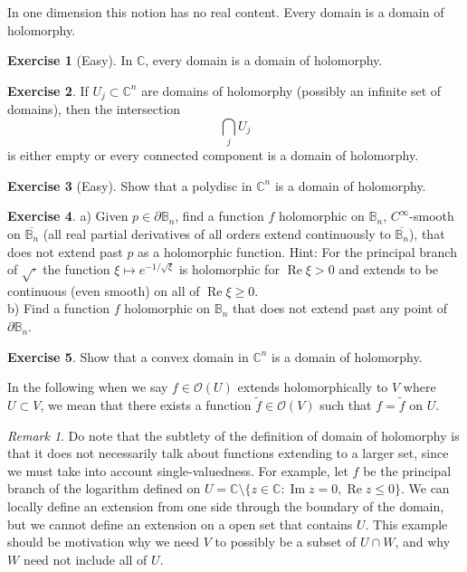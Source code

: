 \documentclass[12pt,openany]{book}
\renewcommand{\Re}{\operatorname{Re}}
\renewcommand{\Im}{\operatorname{Im}}
\newcommand{\C}{{\mathbb{C}}}
\newcommand{\bB}{{\mathbb{B}}}
\newcommand{\sO}{{\mathscr{O}}}
\theoremstyle{plain}
\theoremstyle{remark}
\newtheorem{remark}[thm]{Remark}
\theoremstyle{definition}
\newenvironment{exbox}{%
    \def\FrameCommand{\vrule width 1pt \relax\hspace {10pt}}%
    \MakeFramed {\advance \hsize -\width \FrameRestore }%
}{%
    \endMakeFramed
}
\theoremstyle{exercise}
\newtheorem{exercise}{Exercise}[section]
\theoremstyle{example}
\begin{document}
\pagebreak[2]
In one dimension this notion has no real content.  Every domain is a domain
of holomorphy.

\begin{exbox}
\begin{exercise}[Easy]
In $\C$, every domain is a domain of holomorphy.
\end{exercise}

\begin{exercise}
If $U_j \subset \C^n$ are domains of holomorphy (possibly an infinite set of
domains), then the intersection
\begin{equation*}
\bigcap_{j} U_j
\end{equation*}
is either empty or every connected component is a domain of holomorphy.
\end{exercise}

\begin{exercise}[Easy]
Show that a polydisc in $\C^n$ is a domain of holomorphy.
\end{exercise}

\begin{exercise}
a) Given $p \in \partial \bB_n$, find a function $f$ holomorphic on
$\bB_n$,
$C^\infty$-smooth on $\overline{\bB_n}$ (all real partial derivatives of
all orders extend
continuously to $\overline{\bB_n}$), that does not extend past $p$
as a holomorphic function.
Hint: For the principal branch of $\sqrt{\cdot}$ the function $\xi \mapsto
e^{-1/\sqrt{\xi}}$ is holomorphic for $\Re \xi > 0$ and extends to
be continuous (even smooth) on all of $\Re \xi \geq 0$.\\
b) Find a function $f$ holomorphic on $\bB_n$
that does not extend past any point of
$\partial \bB_n$.
\end{exercise}

\begin{exercise}
Show that a convex domain in $\C^n$ is a domain of holomorphy.
\end{exercise}
\end{exbox}

In the following when we say $f \in \sO(U)$ extends holomorphically to $V$ where
$U \subset V$, we mean that there
exists a function $\widetilde{f} \in \sO(V)$ such that $f = \widetilde{f}$ on
$U$.

\begin{remark}
Do note that the subtlety of the definition of domain of holomorphy is that it does not
necessarily talk about functions extending to a larger set, since we must
take into account single-valuedness.  For example, let $f$ be the principal branch
of the logarithm defined on $U = \C \setminus \{ z \in \C : \Im z = 0, \Re z \leq 0
\}$.  We can locally define an extension from one side through the boundary
of the domain, but we cannot define an extension on a open set that
contains $U$.  This example should be motivation why we need $V$ to possibly
be a subset of $U \cap W$, and why $W$ need not include all of $U$.
\end{remark}
\end{document}
